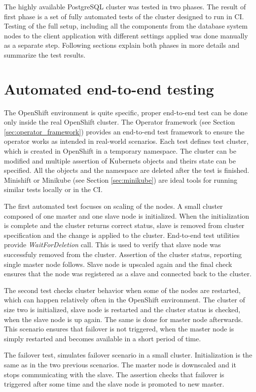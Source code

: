 \documentclass[
  digital, %
  twoside, %
  table,   %
  lof,     %
  lot,     %
]{fithesis3}
\begin{document}
The highly available PostgreSQL cluster was tested in two phases. The result of first phase is a set of fully automated tests of the cluster designed to run in CI. Testing of the full setup, including all the components from the database system nodes to the client application with different settings applied was done manually as a separate step. Following sections explain both phases in more details and summarize the test results.

\section{Automated end-to-end testing}
The OpenShift environment is quite specific, proper end-to-end test can be done only inside the real OpenShift cluster. The Operator framework (see Section \ref{sec:operator_framework}) provides an end-to-end test framework to ensure the operator works as intended in real-world scenarios. Each test defines test cluster, which is created in OpenShift in a temporary namespace. The cluster can be modified and multiple assertion of Kubernets objects and theirs state can be specified. All the objects and the namespace are deleted after the test is finished. Minishift or Minikube (see Section \ref{sec:minikube}) are ideal tools for running similar tests locally or in the CI.

The first automated test focuses on scaling of the nodes. A small cluster composed of one master and one slave node is initialized. When the initialization is complete and the cluster returns correct status, slave is removed from cluster specification and the change is applied to the cluster. End-to-end test utilities provide \textit{WaitForDeletion} call. This is used to verify that slave node was successfuly removed from the cluster. Assertion of the cluster status, reporting single master node follows.  Slave node is upscaled again and the final check ensures that the node was registered as a slave and connected back to the cluster.

The second test checks cluster behavior when some of the nodes are restarted, which can happen relatively often in the OpenShift environment. The cluster of size two is initialized, slave node is restarted and the cluster status is checked, when the slave node is up again. The same is done for master node afterwards. This scenario ensures that failover is not triggered, when the master node is simply restarted and becomes available in a short period of time.

The failover test, simulates failover scenario in a small cluster. Initialization is the same as in the two previous scenarios. The master node is downscaled and it stops communicating with the slave. The assertion checks that failover is triggered after some time and the slave node is promoted to new master.
\end{document}
